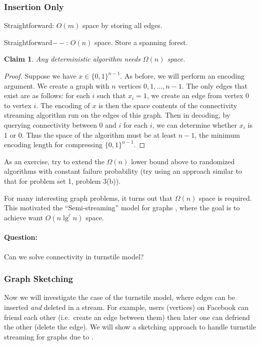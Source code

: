 \documentclass[11pt]{article}
\newtheorem{claim}[thm]{Claim}
\theoremstyle{definition}
\theoremstyle{remark}
\begin{document}
\subsubsection*{Insertion Only}
Straightforward: $O(m)$ space by storing all edges.

Straightforward$--$: $O(n)$ space. Store a spanning forest.

\begin{claim}
Any deterministic algorithm needs $\Omega(n)$ space.
\end{claim}

\begin{proof}
Suppose we have $x\in\{0,1\}^{n-1}$. As before, we will perform an encoding argument. We create a graph with $n$ vertices $0,1,\ldots,n-1$. The only edges that exist are as follows: for each $i$ such that $x_i=1$, we create an edge from vertex $0$ to vertex $i$. The encoding of $x$ is then the space contents of the connectivity streaming algorithm run on the edges of this graph. Then in decoding, by querying connectivity between $0$ and $i$ for each $i$, we can determine whether $x_i$ is $1$ or $0$. Thus the space of the algorithm must be at least $n-1$, the minimum encoding length for compressing $\{0,1\}^{n-1}$.
\end{proof}

As an exercise, try to extend the $\Omega(n)$ lower bound above to randomized algorithms with constant failure probability (try using an approach similar to that for problem set 1, problem 3(b)). 

For many interesting graph problems, it turns out that $\Omega(n)$ space is required. This motivated the ``Semi-streaming'' model for graphs \cite{FKM05}, where the goal is to achieve want $O(n\lg^c n)$ space.

\paragraph{Question:} Can we solve connectivity in turnstile model?

\subsubsection{Graph Sketching}
Now we will investigate the case of the turnstile model, where edges can be inserted {\em and} deleted in a stream. For example, users (vertices) on Facebook can friend each other (i.e.\ create an edge between them) then later one can defriend the other (delete the edge). We will show a sketching approach to handle turnstile streaming for graphs due to \cite{AGM12}.
\end{document}
